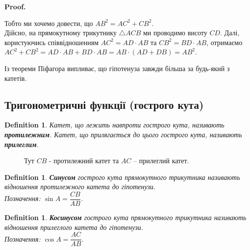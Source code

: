 \documentclass[a4paper, 10pt]{article}
\makeatletter
\theoremstyle{theoremdd}
\theoremstyle{theoremdd}
\theoremstyle{theoremdd}
\newtheorem{definition}[theorem]{Definition}
\theoremstyle{theoremdd}
\theoremstyle{theoremdd}
\theoremstyle{theoremdd}
\theoremstyle{theoremdd}
\theoremstyle{theoremdd}
\theoremstyle{theoremdd}
\renewenvironment{proof}[1][Proof.\\]{\par
\pushQED{\hfill \qed}%
\normalfont \topsep6\p@\@plus6\p@\relax
\trivlist
\item\relax
{\bfseries
#1\@addpunct{.}}\hspace\labelsep\ignorespaces
}{%
\popQED\endtrivlist\@endpefalse
}
\makeatother
\begin{document}
\begin{proof}
Тобто ми хочемо довести, що $AB^2 = AC^2 + CB^2$.\\
Дійсно, на прямокутному трикутнику $\triangle ACB$ ми проводимо висоту $CD$. Далі, користуючись співвідношенням $AC^2 = AD \cdot AB$ та $CB^2 = BD \cdot AB$, отримаємо \\
$AC^2 + CB^2 = AD \cdot AB + BD \cdot AB = AB \cdot (AD + DB) = AB^2$.
\end{proof}

Із теореми Піфагора випливає, що гіпотенуза завжди більша за будь-який з катетів.

\subsection{Тригонометричні функції (гострого кута)}
\begin{definition}
Катет, що лежить навпроти гострого кута, називають \textbf{протилежним}. Катет, що прилягається до цього гострого кута, називають \textbf{прилеглим}. 
\end{definition}

\begin{figure}[H]
\centering
{}
\caption*{Тут $CB$ - протилежний катет та $AC$ -- прилеглий катет.}
\end{figure}

\begin{definition}
\textbf{Синусом} гострого кута прямокутного трикутника називають відношення протилежного катета до гіпотенузи.\\
Позначення: $\sin A = \dfrac{CB}{AB}$.
\end{definition}

\begin{definition}
\textbf{Косинусом} гострого кута прямокутного трикутника називають відношення прилеглого катета до гіпотенузи.\\
Позначення: $\cos A = \dfrac{AC}{AB}$.
\end{definition}
\end{document}
